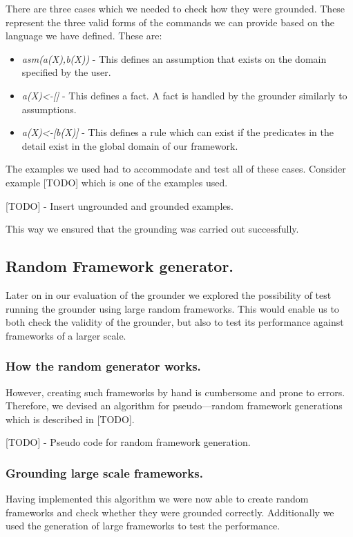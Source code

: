 There are three cases which we needed to check how they were grounded. These represent the three valid forms of the commands we can provide based on the language we have defined. These are:

\begin{itemize}
\item \emph{asm(a(X),b(X))} - This defines an assumption that exists on the domain specified by the user.
\item \emph{a(X)\textless-[]} - This defines a fact. A fact is handled by the grounder similarly to assumptions.
\item \emph{a(X)\textless-[b(X)]} - This defines a rule which can exist if the predicates in the detail exist in the global domain of our framework.
\end{itemize}

The examples we used had to accommodate and test all of these cases. Consider example [TODO] which is one of the examples used.

[TODO] - Insert ungrounded and grounded examples.

This way we ensured that the grounding was carried out successfully. 

\subsection{Random Framework generator.}
Later on in our evaluation of the grounder we explored the possibility of test running the grounder using large random frameworks. This would enable us to both check the validity of the grounder, but also to test its performance against frameworks of a larger scale.

\subsubsection{How the random generator works.}

However, creating such frameworks by hand is cumbersome and prone to errors. Therefore, we devised an algorithm for pseudo---random framework generations which is described in [TODO].

[TODO] - Pseudo code for random framework generation.

\subsubsection{Grounding large scale frameworks.}

Having implemented this algorithm we were now able to create random frameworks and check whether they were grounded correctly. Additionally we used the generation of large frameworks to test the performance.

